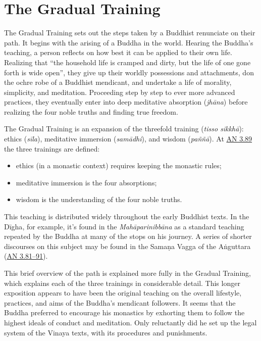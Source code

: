 \documentclass[12pt,openany]{book}%
\begin{document}
\section*{The Gradual Training}

The Gradual Training sets out the steps taken by a Buddhist renunciate on their path. It begins with the arising of a Buddha in the world. Hearing the Buddha’s teaching, a person reflects on how best it can be applied to their own life. Realizing that “the household life is cramped and dirty, but the life of one gone forth is wide open”, they give up their worldly possessions and attachments, don the ochre robe of a Buddhist mendicant, and undertake a life of morality, simplicity, and meditation. Proceeding step by step to ever more advanced practices, they eventually enter into deep meditative absorption (\textit{\textsanskrit{jhāna}}) before realizing the four noble truths and finding true freedom.

The Gradual Training is an expansion of the threefold training (\textit{tisso \textsanskrit{sikkhā}}): ethics (\textit{\textsanskrit{sīla}}), meditative immersion (\textit{\textsanskrit{samādhi}}), and wisdom (\textit{\textsanskrit{paññā}}). At \href{https://suttacentral.net/an3.89}{AN 3.89} the three trainings are defined:

\begin{itemize}%
\item ethics (in a monastic context) requires keeping the monastic rules;%
\item meditative immersion is the four absorptions;%
\item wisdom is the understanding of the four noble truths.%
\end{itemize}

This teaching is distributed widely throughout the early Buddhist texts. In the \textsanskrit{Dīgha}, for example, it’s found in the \textit{\textsanskrit{Mahāparinibbāna}} as a standard teaching repeated by the Buddha at many of the stops on his journey. A series of shorter discourses on this subject may be found in the \textsanskrit{Samaṇa} Vagga of the \textsanskrit{Aṅguttara} (\href{https://suttacentral.net/an3{-}samanavagga}{AN 3.81–91}).

This brief overview of the path is explained more fully in the Gradual Training, which explains each of the three trainings in considerable detail. This longer exposition appears to have been the original teaching on the overall lifestyle, practices, and aims of the Buddha’s mendicant followers. It seems that the Buddha preferred to encourage his monastics by exhorting them to follow the highest ideals of conduct and meditation. Only reluctantly did he set up the legal system of the Vinaya texts, with its procedures and punishments.
\end{document}
